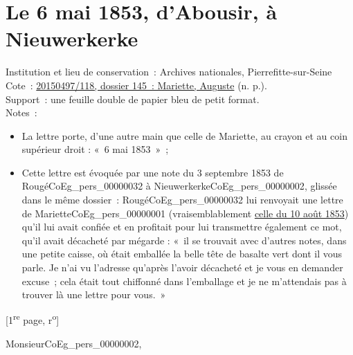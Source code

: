 \documentclass{book}
\begin{document}
\section*{Le 6 mai 1853, d’Abousir, à Nieuwerkerke}  
{\footnotesize
\noindent Institution et lieu de conservation~: Archives nationales, Pierrefitte-sur-Seine\\
Cote~: \hyperlink{CoEg_Mariette_ms_001}{20150497/118, dossier 145~: Mariette, Auguste} (n. p.).\\
Support~: une feuille double de papier bleu de petit format.\\
Notes~: \begin{itemize} \item La lettre porte, d’une autre main que celle de Mariette, au crayon et au coin supérieur droit : «~6 mai 1853~»~; \item Cette lettre est évoquée par une note du 3 septembre 1853 de Rougé\gls{CoEg_pers_00000032} à Nieuwerkerke\gls{CoEg_pers_00000002}, glissée dans le même dossier~: Rougé\gls{CoEg_pers_00000032} lui renvoyait une lettre de Mariette\gls{CoEg_pers_00000001} (vraisemblablement \hyperlink{CoEg_Mariette_1853-08-10}{celle du 10 août 1853}) qu'il lui avait confiée et en profitait pour lui transmettre également ce mot, qu'il avait décacheté par mégarde : «~il se trouvait avec d’autres notes, dans une petite caisse, où était emballée la belle tête de basalte vert dont il vous parle. Je n’ai vu l’adresse qu’après l’avoir décacheté et je vous en demander excuse~; cela était tout chiffonné dans l’emballage et je ne m’attendais pas à trouver là une lettre pour vous.~» \end{itemize}
\begin{center} {[1\textsuperscript{re} page, r\textsuperscript{o}]}\end{center}}

\hspace{1cm} Monsieur\gls{CoEg_pers_00000002},\\
\end{document}
